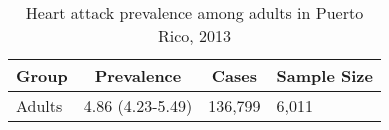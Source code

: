 
\begin{table}[H]
\caption{Heart attack prevalence among adults in Puerto Rico, 2013\label{tab:Overall.tabl.Heart_Attack.2013}} 
\begin{center}
\begin{tabular}{llll}
\hline\hline
\multicolumn{1}{l}{Group}&\multicolumn{1}{c}{Prevalence}&\multicolumn{1}{c}{Cases}&\multicolumn{1}{c}{Sample Size}\tabularnewline
\hline
Adults&4.86 (4.23-5.49)&136,799&6,011\tabularnewline
\hline
\end{tabular}\end{center}

\end{table}
 
